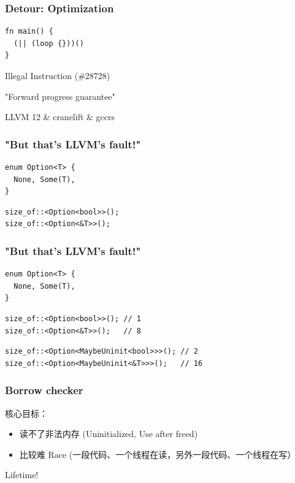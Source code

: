 \documentclass[UTF-8]{ctexbeamer}
\begin{document}
\begin{frame}[fragile]
  \frametitle{Detour: Optimization}
  \begin{verbatim}
fn main() {
  (|| (loop {}))()
}
  \end{verbatim}
  
  \pause
  \vspace{1em}

  Illegal Instruction (\#28728)

  "Forward progress guarantee"

  \pause

  LLVM 12 \& cranelift \& gccrs
\end{frame}

\begin{frame}[fragile]
  \frametitle{"But that's LLVM's fault!"}

  \begin{verbatim}
enum Option<T> {
  None, Some(T),
}
  \end{verbatim}
  \begin{verbatim}
size_of::<Option<bool>>();
size_of::<Option<&T>>();
  \end{verbatim}
\end{frame}

\begin{frame}[fragile]
  \frametitle{"But that's LLVM's fault!"}

  \begin{verbatim}
enum Option<T> {
  None, Some(T),
}
  \end{verbatim}
  \begin{verbatim}
size_of::<Option<bool>>(); // 1
size_of::<Option<&T>>();   // 8
  \end{verbatim}

  \pause

  \begin{verbatim}
size_of::<Option<MaybeUninit<bool>>>(); // 2
size_of::<Option<MaybeUninit<&T>>>();   // 16
  \end{verbatim}
\end{frame}

\begin{frame}
  \frametitle{Borrow checker}

  核心目标：
  \begin{itemize}
    \item 读不了非法内存 (Uninitialized, Use after freed)
    \item 比较难 Race (一段代码、一个线程在读，另外一段代码、一个线程在写）
  \end{itemize}

  \pause
  \vspace{1em}

  Lifetime!
\end{frame}
\end{document}

